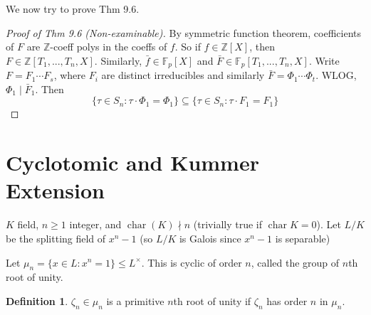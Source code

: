\documentclass{article}
\theoremstyle{definition}
\newtheorem*{defn*}{Definition}
\theoremstyle{remark}
\theoremstyle{plain}
\newcommand{\ZZ}{\mathbb{Z}}
\newcommand{\FF}{\mathbb{F}}
\begin{document}
We now try to prove Thm 9.6.
\begin{proof}[Proof of Thm 9.6 (Non-examinable)]
    By symmetric function theorem, coefficients of $F$ are $\ZZ$-coeff polys in the coeffs of $f$. So if $f\in \ZZ[X]$, then $F\in \ZZ[T_1,...,T_n,X]$. Similarly, $\bar f\in \FF_p[X]$ and $\bar F\in \FF_p[T_1,...,T_n,X]$. Write $F=F_1\cdots F_s$, where $F_i$ are distinct irreducibles and similarly $\bar F=\Phi_1\cdots\Phi_t$. WLOG, $\Phi_1\mid \bar F_1$. Then 
    \[\{\tau\in S_n:\tau\cdot \Phi_1=\Phi_1\}\subseteq \{\tau\in S_n:\tau\cdot F_1=F_1\}\]
\end{proof}


\section{Cyclotomic and Kummer Extension}
$K$ field, $n\ge 1$ integer, and $\operatorname{char}(K)\nmid n$ (trivially true if $\operatorname{char}{K}=0$). Let $L/K$ be the splitting field of $x^n-1$ (so $L/K$ is Galois since $x^n-1$ is separable)

Let $\mu_n=\{x\in L:x^n=1\}\le L^\times$. This is cyclic of order $n$, called the group of $n$th root of unity.
\begin{defn*}
    $\zeta_n\in\mu_n$ is a primitive $n$th root of unity if $\zeta_n$ has order $n$ in $\mu_n$.
\end{defn*}
\end{document}
